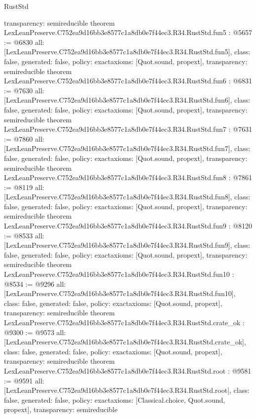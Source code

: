 \begin{lexlean}{RustStd}
\begin{coremodule}
{  transparency: semireducible
}
theorem LexLeanPreserve.C752ea9d16bb3e8577c1a8db0e7f44ec3.R34.RustStd.fun5 : @5657 := @6830 {
  all: [LexLeanPreserve.C752ea9d16bb3e8577c1a8db0e7f44ec3.R34.RustStd.fun5],
  class: false,
  generated: false,
  policy: exact{axioms: [Quot.sound, propext]},
  transparency: semireducible
}
theorem LexLeanPreserve.C752ea9d16bb3e8577c1a8db0e7f44ec3.R34.RustStd.fun6 : @6831 := @7630 {
  all: [LexLeanPreserve.C752ea9d16bb3e8577c1a8db0e7f44ec3.R34.RustStd.fun6],
  class: false,
  generated: false,
  policy: exact{axioms: [Quot.sound, propext]},
  transparency: semireducible
}
theorem LexLeanPreserve.C752ea9d16bb3e8577c1a8db0e7f44ec3.R34.RustStd.fun7 : @7631 := @7860 {
  all: [LexLeanPreserve.C752ea9d16bb3e8577c1a8db0e7f44ec3.R34.RustStd.fun7],
  class: false,
  generated: false,
  policy: exact{axioms: [Quot.sound, propext]},
  transparency: semireducible
}
theorem LexLeanPreserve.C752ea9d16bb3e8577c1a8db0e7f44ec3.R34.RustStd.fun8 : @7861 := @8119 {
  all: [LexLeanPreserve.C752ea9d16bb3e8577c1a8db0e7f44ec3.R34.RustStd.fun8],
  class: false,
  generated: false,
  policy: exact{axioms: [Quot.sound, propext]},
  transparency: semireducible
}
theorem LexLeanPreserve.C752ea9d16bb3e8577c1a8db0e7f44ec3.R34.RustStd.fun9 : @8120 := @8533 {
  all: [LexLeanPreserve.C752ea9d16bb3e8577c1a8db0e7f44ec3.R34.RustStd.fun9],
  class: false,
  generated: false,
  policy: exact{axioms: [Quot.sound, propext]},
  transparency: semireducible
}
theorem LexLeanPreserve.C752ea9d16bb3e8577c1a8db0e7f44ec3.R34.RustStd.fun10 : @8534 := @9296 {
  all: [LexLeanPreserve.C752ea9d16bb3e8577c1a8db0e7f44ec3.R34.RustStd.fun10],
  class: false,
  generated: false,
  policy: exact{axioms: [Quot.sound, propext]},
  transparency: semireducible
}
theorem LexLeanPreserve.C752ea9d16bb3e8577c1a8db0e7f44ec3.R34.RustStd.crate_ok : @9300 := @9573 {
  all: [LexLeanPreserve.C752ea9d16bb3e8577c1a8db0e7f44ec3.R34.RustStd.crate_ok],
  class: false,
  generated: false,
  policy: exact{axioms: [Quot.sound, propext]},
  transparency: semireducible
}
theorem LexLeanPreserve.C752ea9d16bb3e8577c1a8db0e7f44ec3.R34.RustStd.root : @9581 := @9591 {
  all: [LexLeanPreserve.C752ea9d16bb3e8577c1a8db0e7f44ec3.R34.RustStd.root],
  class: false,
  generated: false,
  policy: exact{axioms: [Classical.choice, Quot.sound, propext]},
  transparency: semireducible
}


\end{coremodule}
\end{lexlean}
